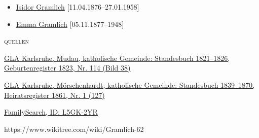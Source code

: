 \begin{person}[
    surname = {Gramlich},
    givenname = {Johann Michael},
    suffix = {1823--1891},
    label = {@I154@}
    ]
\begin{itemize}
\item \hyperref[@I740@]{Isidor Gramlich} [11.04.1876--27.01.1958]
\item \hyperref[@I1887@]{Emma Gramlich} [05.11.1877--1948]
\end{itemize}
\medbreak
\textsc{{quellen}}
\begin{enumerate}[label={[\arabic*]}]
\item \href{http://www.landesarchiv-bw.de/plink/?f=4-1119445-38}{GLA Karlsruhe, Mudau, katholische Gemeinde: Standesbuch 1821–1826, Geburtenregister 1823, Nr. 114 (Bild 38)}
\item \href{http://www.landesarchiv-bw.de/plink/?f=4-1119442-127}{GLA Karlsruhe, Mörschenhardt, katholische Gemeinde: Standesbuch 1839–1870, Heiratsregister 1861, Nr. 1 (127)}
\item \href{https://www.familysearch.org/tree/person/details/L5GK-2YR}{FamilySearch, ID: L5GK-2YR}
\item https://www.wikitree.com/wiki/Gramlich-62
\end{enumerate}

\end{person}

